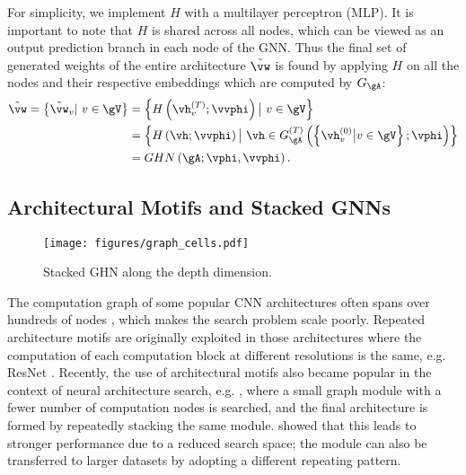 \documentclass{article} %
\begin{document}
For simplicity, we implement $H$ with a multilayer perceptron (MLP). It is important to note that
$H$ is shared across all nodes, which can be viewed as an output prediction branch in each node of
the GNN. Thus the final set of generated weights of the entire architecture $\tilde{\vw}$ is found
by applying $H$ on all the nodes and their respective embeddings which are computed by $G_\gA$:
\begin{align}
\tilde{\vw}=\left\{\tilde{\vw}_v | \ v \in \gV  \right\}
   &= \left\{H\left(\vh_v^{(T)}; \vvphi\right) \big| \ v \in \gV  \right\} \\
  &=  \left\{H\left(\vh; \vvphi\right) \big| \ \vh \in G_\gA^{(T)}\left(\left\{\vh_v^{(0)} \big| v \in \gV \right\}; \vphi\right)\right\} \\
  &= GHN\left(\gA; \vphi, \vvphi\right).
\end{align}\subsection{Architectural Motifs and Stacked GNNs}\label{section:graph_cells}\begin{wrapfigure}[]{r}{0.33\textwidth}
\vspace*{-0.5cm}
\texttt{[image: figures/graph\_cells.pdf]}
\caption{Stacked GHN along the depth dimension.}
\label{fig:graph_cells}
\end{wrapfigure}
The computation graph of some popular CNN architectures often spans over hundreds of nodes
\citep{he2016deep,huang2017densely}, which makes the search problem scale poorly. Repeated
architecture motifs are originally exploited in those architectures where the computation of each
computation block at different resolutions is the same, e.g. ResNet \citep{he2016resnet}. Recently,
the use of architectural motifs also became popular in the context of neural architecture search,
e.g. \citep{zoph2017learning, pham2018efficient}, where a small graph module with a fewer number of
computation nodes is searched, and the final architecture is formed by repeatedly stacking the same
module. \cite{zoph2017learning} showed that this leads to stronger performance due to a reduced
search space; the module can also be transferred to larger datasets by adopting a different
repeating pattern.
\end{document}
